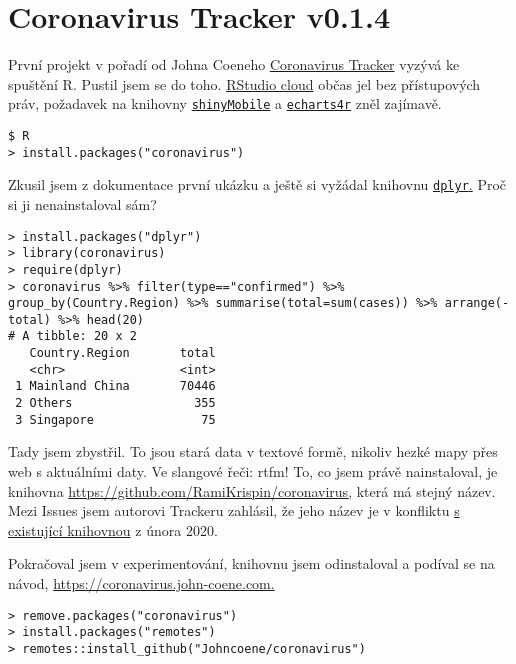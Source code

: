 \section{Coronavirus Tracker v0.1.4}

První projekt v pořadí od Johna Coeneho \href{https://github.com/RConsortium/r-collaboration/blob/master/projects/covid-19/covid-19-tracker.md}{Coronavirus Tracker} vyzývá ke spuštění R. Pustil jsem se do toho. \href{https://rstudio.cloud/project/950251}{RStudio cloud} občas jel bez přístupových práv, požadavek na knihovny 
\href{https://rinterface.github.io/shinyMobile/}{\texttt{shinyMobile}} a 
\href{https://echarts4r.john-coene.com/}{\texttt{echarts4r}}
zněl zajímavě.

\begin{lstlisting}
$ R
> install.packages("coronavirus")
\end{lstlisting}

Zkusil jsem z dokumentace první ukázku a ještě si vyžádal knihovnu 
\href{https://cran.r-project.org/web/packages/dplyr/index.html}{\texttt{dplyr}.} Proč si ji nenainstaloval sám?
\begin{lstlisting}
> install.packages("dplyr")
> library(coronavirus)
> require(dplyr)
> coronavirus %>% filter(type=="confirmed") %>% group_by(Country.Region) %>% summarise(total=sum(cases)) %>% arrange(-total) %>% head(20)
# A tibble: 20 x 2
   Country.Region       total
   <chr>                <int>
 1 Mainland China       70446
 2 Others                 355
 3 Singapore               75
\end{lstlisting}

Tady jsem zbystřil. To jsou stará data v textové formě, nikoliv hezké mapy přes web s aktuálními daty. 
Ve slangové řeči: rtfm! 
To, co jsem právě nainstaloval, je knihovna \href{https://github.com/RamiKrispin/coronavirus}{\url{https://github.com/RamiKrispin/coronavirus},} která má stejný název. Mezi Issues jsem autorovi Trackeru zahlásil, že jeho název je v konfliktu \href{https://cran.r-project.org/web/packages/coronavirus/index.html}{s existující knihovnou} z února 2020.

Pokračoval jsem v experimentování, knihovnu jsem odinstaloval a podíval se na návod, \href{https://coronavirus.john-coene.com/#/get-started}{\url{https://coronavirus.john-coene.com}.}
\begin{lstlisting}
> remove.packages("coronavirus")
> install.packages("remotes")
> remotes::install_github("Johncoene/coronavirus")
\end{lstlisting}

